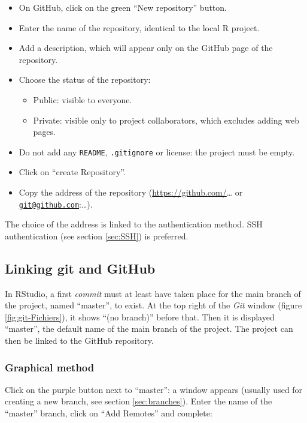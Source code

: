 \documentclass[
  12pt,
  american,
  a4paper,
  extrafontsizes,onecolumn,openright
  ]{memoir}
\providecommand{\tightlist}{%
  \setlength{\itemsep}{0pt}\setlength{\parskip}{0pt}}
\begin{document}
\begin{itemize}
\tightlist
\item
  On GitHub, click on the green \enquote{New repository} button.
\item
  Enter the name of the repository, identical to the local R project.
\item
  Add a description, which will appear only on the GitHub page of the repository.
\item
  Choose the status of the repository:

  \begin{itemize}
  \tightlist
  \item
    Public: visible to everyone.
  \item
    Private: visible only to project collaborators, which excludes adding web pages.
  \end{itemize}
\item
  Do not add any \texttt{README}, \texttt{.gitignore} or license: the project must be empty.
\item
  Click on \enquote{create Repository}.
\item
  Copy the address of the repository (\url{https://github.com/}\ldots{} or \href{mailto:git@github.com}{\nolinkurl{git@github.com}}:\ldots).
\end{itemize}

The choice of the address is linked to the authentication method.
SSH authentication (see section \ref{sec:SSH}) is preferred.

\subsection{Linking git and GitHub}\label{linking-git-and-github}

In RStudio, a first \emph{commit} must at least have taken place for the main branch of the project, named \enquote{master}, to exist.
At the top right of the \emph{Git} window (figure \ref{fig:git-Fichiers}), it shows \enquote{(no branch)} before that.
Then it is displayed \enquote{master}, the default name of the main branch of the project.
The project can then be linked to the GitHub repository.

\subsubsection{Graphical method}\label{graphical-method}

Click on the purple button next to \enquote{master}: a window appears (usually used for creating a new branch, see section \ref{sec:branches}).
Enter the name of the \enquote{master} branch, click on \enquote{Add Remotes} and complete:
\end{document}
